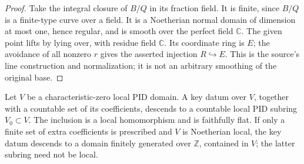 \begin{proof}
Take the integral closure of \(B/Q\) in its fraction field.
It is finite, since \(B/Q\) is a finite-type curve over a field.
It is a Noetherian normal domain of dimension at most one,
hence regular, and is smooth over the perfect field
\(\mathbb C\).
The given point lifts by lying over, with residue field
\(\mathbb C\).
Its coordinate ring is \(E\); the avoidance of all nonzero
\(r\) gives the asserted injection \(R\hookrightarrow E\).
This is the source's line construction and normalization;
it is not an arbitrary smoothing of the original base.
\end{proof}

\begin{srlemma}
\label{lem:ftb-key-countable-local-pid-specialization}
Let \(V\) be a characteristic-zero local PID domain.
A key datum over \(V\), together with a countable set of its
coefficients, descends to a countable local PID subring
\(V_0\subset V\).
The inclusion is a local homomorphism and is faithfully flat.
If only a finite set of extra coefficients is prescribed and
\(V\) is Noetherian local, the key datum descends to a domain
finitely generated over \(\mathbb Z\), contained in \(V\);
the latter subring need not be local.
\end{srlemma}
